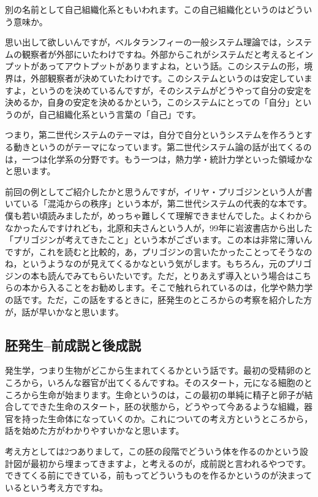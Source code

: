 \documentclass{ltjsbook}
\begin{document}
別の名前として自己組織化系ともいわれます。この自己組織化というのはどういう意味か。

思い出して欲しいんですが，ベルタランフィーの一般システム理論では，システムの観察者が外部にいたわけですね。外部からこれがシステムだと考えるとインプットがあってアウトプットがありますよね，という話。このシステムの形，境界は，外部観察者が決めていたわけです。このシステムというのは安定していますよ，というのを決めているんですが，そのシステムがどうやって自分の安定を決めるか，自身の安定を決めるかという，このシステムにとっての「自分」というのが，自己組織化系という言葉の「自己」です。

つまり，第二世代システムのテーマは，自分で自分というシステムを作ろうとする動きというのがテーマになっています。第二世代システム論の話が出てくるのは，一つは化学系の分野です。もう一つは，熱力学・統計力学といった領域かなと思います。

前回の例としてご紹介したかと思うんですが，イリヤ・プリゴジンという人が書いている「混沌からの秩序」という本\parencite{Prigogine}が，第二世代システムの代表的な本です。僕も若い頃読みましたが，めっちゃ難しくて理解できませんでした。よくわからなかったんですけれども，北原和夫さんという人が，99年に岩波書店から出した「プリゴジンが考えてきたこと」という本がございます\parencite{Kitahara1999}。この本は非常に薄いんですが，これを読むと比較的，あ，プリゴジンの言いたかったことってそうなのね，というようなのが見えてくるかなという気がします。もちろん，元のプリゴジンの本も読んでみてもらいたいです。ただ，とりあえず導入という場合はこちらの本から入ることをお勧めします。そこで触れられているのは，化学や熱力学の話です。ただ，この話をするときに，胚発生のところからの考察を紹介した方が，話が早いかなと思います。


\subsection{胚発生--前成説と後成説}

発生学，つまり生物がどこから生まれてくるかという話です。最初の受精卵のところから，いろんな器官が出てくるんですね。そのスタート，元になる細胞のところから生命が始まります。生命というのは，この最初の単純に精子と卵子が結合してできた生命のスタート，胚の状態から，どうやって今あるような組織，器官を持った生命体になっていくのか。これについての考え方というところから，話を始めた方がわかりやすいかなと思います。

考え方としては2つありまして，この胚の段階でどういう体を作るのかという設計図が最初から埋まってきますよ，と考えるのが，成前説と言われるやつです。できてくる前にできている，前もってどういうものを作るかというのが決まっているという考え方ですね。
\end{document}
